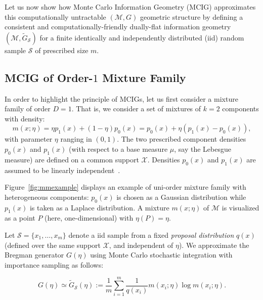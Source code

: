 \documentclass[graybox]{svmult}
\def\eqdef{:=}
\def\tildeG{\tilde{G}}
\def\calS{\mathcal{S}}
\def\calX{\mathcal{X}}
\def\calM{\mathcal{M}}
\begin{document}
Let us now show how Monte Carlo Information Geometry (MCIG) approximates this computationally untractable $(\calM,G)$ geometric structure by defining a consistent and computationally-friendly dually-flat information geometry
 $(\calM,\tildeG_\calS)$ for a finite identically and independently distributed (iid) random sample $\calS$ of prescribed size $m$.

\subsection{MCIG of Order-$1$ Mixture Family}\label{sec:MCIGMM1D}
In order to highlight the principle of MCIGs, let us first consider a mixture family of order $D=1$.
That is, we consider a set of  mixtures of $k=2$ components with density: 
\begin{equation}
m(x;\eta)=\eta p_1(x)+(1-\eta)p_0(x)=p_0(x)+\eta(p_1(x)-p_0(x)),
\end{equation} 
with parameter $\eta$ ranging in $(0,1)$.
  The two prescribed component densities  $p_0(x)$ and $p_1(x)$ (with respect to a base measure $\mu$, say the Lebesgue measure) are defined on a common support $\calX$.
Densities $p_0(x)$ and $p_1(x)$ are assumed to be linearly independent~\cite{IG-2014}.

Figure~\ref{fig:mmexample} displays an example of uni-order mixture family with heterogeneous components: 
$p_0(x)$ is chosen as a Gaussian distribution while $p_1(x)$ is taken as a Laplace distribution.
A mixture $m(x;\eta)$ of $\calM$ is visualized as a point $P$ (here, one-dimensional) with $\eta(P)=\eta$.

Let $\calS=\{x_1,\ldots, x_m\}$ denote a iid sample from a fixed {\em proposal distribution} $q(x)$ (defined over the same support $\calX$, and independent of $\eta$). We approximate the  Bregman generator $G(\eta)$ using Monte Carlo stochastic integration with importance sampling as follows:

\begin{equation}\label{eq:mfag1D}
G(\eta) \simeq  \tildeG_\calS(\eta) \eqdef \frac{1}{m} \sum_{i=1}^m  \frac{1}{q(x_i)} m(x_i;\eta)\log m(x_i;\eta).
\end{equation}
\end{document}
